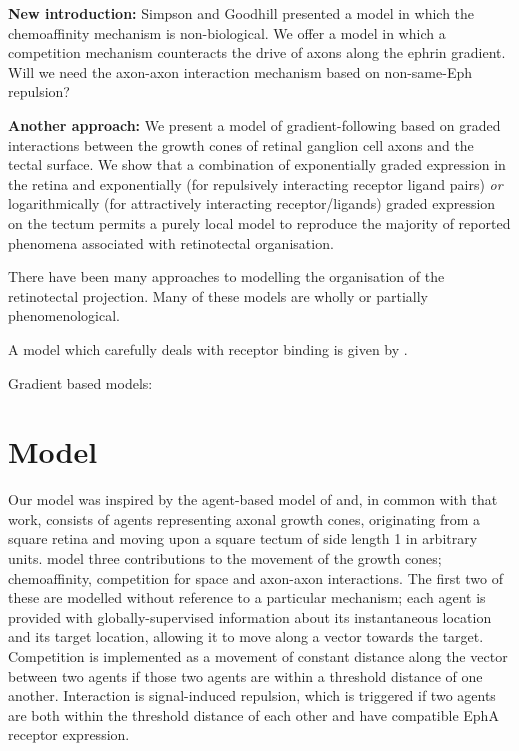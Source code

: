 \documentclass[11pt, a4paper]{article}
\begin{document}
\textbf{New introduction:} Simpson and Goodhill presented a model in which the
chemoaffinity mechanism is non-biological. We offer a model in which a
competition mechanism counteracts the drive of axons along the ephrin
gradient. Will we need the axon-axon interaction mechanism based on
non-same-Eph repulsion?

\textbf{Another approach:} We present a model of gradient-following based on graded
interactions between the growth cones of retinal ganglion cell axons and the
tectal surface. We show that a combination of exponentially graded expression
in the retina \citep{reber_relative_2004} and exponentially (for repulsively
interacting receptor ligand pairs) \emph{or} logarithmically (for attractively
interacting receptor/ligands) graded expression on the tectum permits a purely
local model to reproduce the majority of reported phenomena associated with
retinotectal organisation.

There have been many approaches to modelling the organisation of the
retinotectal projection. Many of these models are wholly or partially
phenomenological.

A model which carefully deals with receptor
binding is given by \citet{naoki_revisiting_2017} \citep[see also][]{mortimer_bayesian_2009}.

Gradient based models: \citet{nakamoto_topographically_1996}

\section{Model}

Our model was inspired by the agent-based model of \cite{simpson_simple_2011}
and, in common with that work, consists of agents representing axonal growth
cones, originating from a square retina and moving upon a square tectum of
side length 1 in arbitrary units.
%
\citet{simpson_simple_2011} model three contributions to the movement of the growth
cones; chemoaffinity, competition for space and axon-axon interactions. The
first two of these are modelled without reference to a particular mechanism;
each agent is provided with globally-supervised information about its
instantaneous location and its target location, allowing it to move along a
vector towards the target. Competition is implemented as a movement of
constant distance along the vector between two agents if those two agents are
within a threshold distance of one another. Interaction is signal-induced
repulsion, which is triggered if two agents are both within the threshold
distance of each other and have compatible EphA receptor expression.
\end{document}
